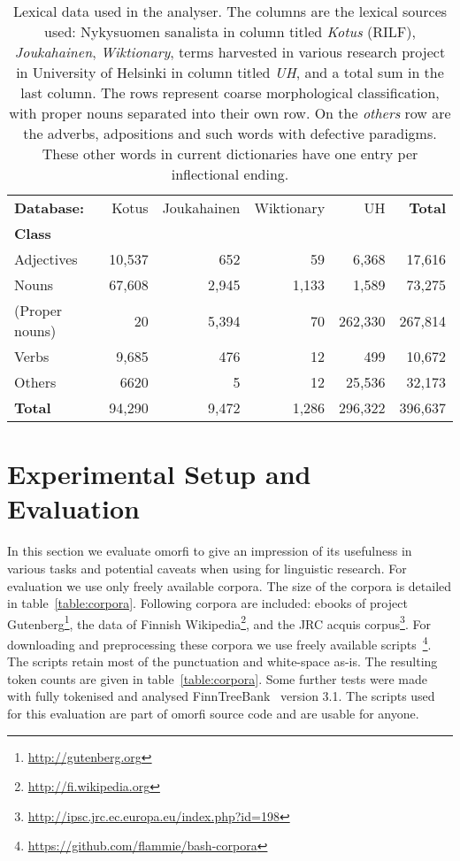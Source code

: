 \documentclass[a4paper,12pt]{article}
\begin{document}
\begin{table}
    \begin{scriptsize}
  \centering
    \begin{tabular}{|l|r|r|r|r||r|}
        \hline
        \bf Database: & Kotus & Joukahainen & Wiktionary & UH & \bf Total \\
        \bf Class   & & & & & \\
        \hline
        Adjectives     & 10,537 & 652   & 59    & 6,368   & 17,616  \\
        Nouns          & 67,608 & 2,945 & 1,133 & 1,589   & 73,275  \\
        (Proper nouns) & 20     & 5,394 & 70    & 262,330 & 267,814 \\
        Verbs          & 9,685  & 476   & 12    & 499     & 10,672  \\
        Others         & 6620   & 5     & 12    & 25,536  & 32,173  \\
        \hline
        \bf Total      & 94,290 & 9,472 & 1,286 & 296,322 & 396,637 \\
        \hline
    \end{tabular}
  \caption{Lexical data used in the analyser.  The columns are the lexical
      sources used: Nykysuomen sanalista in column titled \textit{Kotus} (RILF),
      \textit{Joukahainen}, \textit{Wiktionary}, terms harvested in various
      research project in University of Helsinki in column titled \textit{UH},
      and a total sum in the last column. The rows represent coarse
      morphological classification, with proper nouns separated into their own
      row. On the \textit{others} row are the adverbs, adpositions and such words
      with defective paradigms. These other words in current dictionaries have
      one entry per inflectional ending.
  \label{table:lexical}}
  \end{scriptsize}
\end{table}


\section{Experimental Setup and Evaluation}
\label{sec:evaluation}

In this section we evaluate omorfi to give an impression of its usefulness
in various tasks and potential caveats when using for linguistic research.
For evaluation we use only freely available corpora. The size of the corpora
is detailed in table~\ref{table:corpora}. Following corpora are included:
ebooks of project Gutenberg\footnote{\url{http://gutenberg.org}}, the data
of Finnish Wikipedia\footnote{\url{http://fi.wikipedia.org}}, and the JRC
acquis corpus\footnote{\url{http://ipsc.jrc.ec.europa.eu/index.php?id=198}}.
For downloading and preprocessing these corpora we use freely available
scripts~\footnote{\url{https://github.com/flammie/bash-corpora}}. The
scripts retain most of the punctuation and white-space as-is. The resulting
token counts are given in table~\ref{table:corpora}. Some further tests were
made with fully tokenised and analysed
FinnTreeBank~\citep{voutilainen2012specifying} version 3.1.  The scripts
used for this evaluation are part of omorfi source code and are usable for
anyone.
\end{document}
